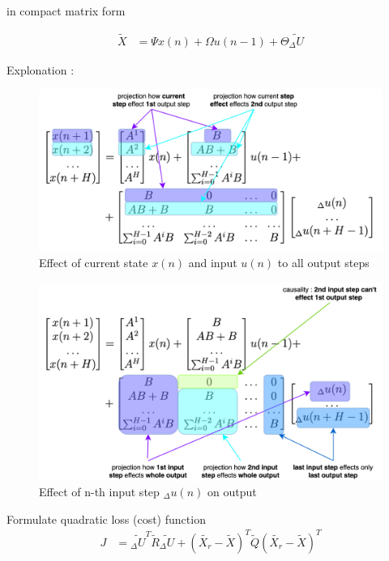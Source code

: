 \documentclass[12pt,twoside,onecolumn,openany,extrafontsizes,dvipsnames]{memoir}
\begin{document}
        in compact matrix form

        \begin{align*}
            \tilde{X} &= \Psi x(n) + \Omega u(n-1) + \Theta \tilde{_\Delta U}
        \end{align*}

        Explonation : 
        \begin{figure}[!htb]
            \centering
            \includegraphics[scale=0.8]{../diagrams/control/control-mpc_exp_1.png}
            \caption{Effect of current state $x(n)$ and input $u(n)$ to all output steps}
            \label{fig:mpc_exp_1}
        \end{figure}

        \begin{figure}[!htb]
            \centering
            \includegraphics[scale=0.8]{../diagrams/control/control-mpc_exp_2.png}
            \caption{Effect of n-th input step $_\Delta u(n)$ on output}
            \label{fig:mpc_exp_2}
        \end{figure}


        Formulate quadratic loss (cost) function
        \begin{align*}
            J &= \tilde{_\Delta U}^T \tilde{R} \tilde{_\Delta U} 
                        + (\tilde{X_r} - \tilde{X})^T \tilde{Q} (\tilde{X_r} - \tilde{X})^T \\
        \end{align*}
\end{document}
